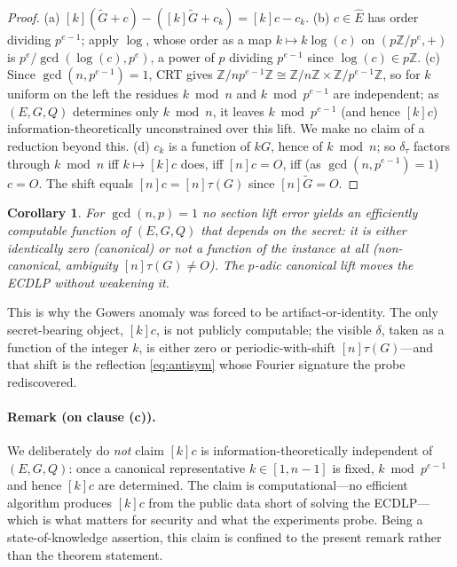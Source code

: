 \documentclass[11pt]{article}
\newtheorem{corollary}{Corollary}
\theoremstyle{definition}
\newcommand{\Z}{\mathbb{Z}}
\newcommand{\Ehat}{\widehat{E}}
\begin{document}
\begin{proof}
(a) $[k](\widetilde G+c)-([k]\widetilde G+c_k)=[k]c-c_k$. (b) $c\in\Ehat$
has order dividing $p^{e-1}$; apply $\log$, whose order as a map
$k\mapsto k\log(c)$ on $(p\Z/p^e,+)$ is $p^e/\gcd(\log(c),p^e)$, a power
of $p$ dividing $p^{e-1}$ since $\log(c)\in p\Z$. (c) Since
$\gcd(n,p^{e-1})=1$, CRT gives $\Z/np^{e-1}\Z\cong\Z/n\Z\times\Z/p^{e-1}\Z$,
so for $k$ uniform on the left the residues $k\bmod n$ and $k\bmod
p^{e-1}$ are independent; as $(E,G,Q)$ determines only $k\bmod n$, it
leaves $k\bmod p^{e-1}$ (and hence $[k]c$) information-theoretically
unconstrained over this lift. We make no claim of a reduction beyond
this. (d) $c_k$ is a function of $kG$, hence of
$k\bmod n$; so $\delta_\tau$ factors through $k\bmod n$ iff
$k\mapsto[k]c$ does, iff $[n]c=O$, iff (as $\gcd(n,p^{e-1})=1$) $c=O$. The
shift equals $[n]c=[n]\tau(G)$ since $[n]\widetilde G=O$.
\end{proof}

\begin{corollary}\label{cor:main}
For $\gcd(n,p)=1$ no section lift error yields an efficiently computable
function of $(E,G,Q)$ that depends on the secret: it is either
identically zero (canonical) or not a function of the instance at all
(non-canonical, ambiguity $[n]\tau(G)\neq O$). The $p$-adic canonical
lift moves the ECDLP without weakening it.
\end{corollary}

This is why the Gowers anomaly was forced to be artifact-or-identity. The
only secret-bearing object, $[k]c$, is not publicly computable; the
visible $\delta$, taken as a function of the integer $k$, is either zero
or periodic-with-shift $[n]\tau(G)$---and that shift is the reflection
\eqref{eq:antisym} whose Fourier signature the probe rediscovered.

\paragraph{Remark (on clause (c)).} We deliberately do \emph{not} claim
$[k]c$ is information-theoretically independent of $(E,G,Q)$: once a
canonical representative $k\in[1,n-1]$ is fixed, $k\bmod p^{e-1}$ and
hence $[k]c$ are determined. The claim is computational---no efficient
algorithm produces $[k]c$ from the public data short of solving the
ECDLP---which is what matters for security and what the experiments
probe. Being a state-of-knowledge assertion, this claim is confined to
the present remark rather than the theorem statement.
\end{document}
